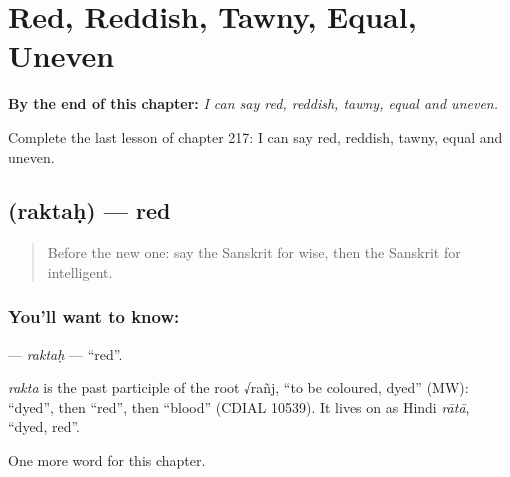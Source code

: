 
\chapter{Red, Reddish, Tawny, Equal, Uneven}
\label{ch:sa-red-reddish-tawny-equal-uneven}

\begin{chapteropening}
\textbf{By the end of this chapter:} \emph{I can say red, reddish, tawny, equal and uneven.}

Complete the last lesson of chapter 217: I can say red, reddish, tawny, equal and uneven.
\end{chapteropening}

\section[\texorpdfstring{\sk{रक्तः} (raktaḥ)}{रक्तः (raktaḥ)}]{ (raktaḥ) — red}

\label{lesson:SA-C217-raktah}



\begin{quote}
Before the new one: say the Sanskrit for wise, then the Sanskrit for intelligent.
\end{quote}

\subsection*{You'll want to know: }
\textbf{} — \emph{raktaḥ} — \textquotedblleft{}red\textquotedblright{}.

\begin{cousinweb}
\emph{rakta} is the past participle of the root √rañj, \textquotedblleft{}to be coloured, dyed\textquotedblright{} (MW): \textquotedblleft{}dyed\textquotedblright{}, then \textquotedblleft{}red\textquotedblright{}, then \textquotedblleft{}blood\textquotedblright{} (CDIAL 10539). It lives on as Hindi \emph{rātā}, \textquotedblleft{}dyed, red\textquotedblright{}.
\end{cousinweb}

\begin{grammarlens}[title={What you've built}]
One more word for this chapter.
\end{grammarlens}


